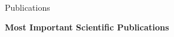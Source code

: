 \documentclass[10pt]{article}
\begin{document}
\begin{cv}
\newpage
\ \\[-60pt]
\begin{cvlist}{Publications}
\item
\end{cvlist}




\textbf{\quad Most Important Scientific Publications}
	

\end{cv}
\end{document}
